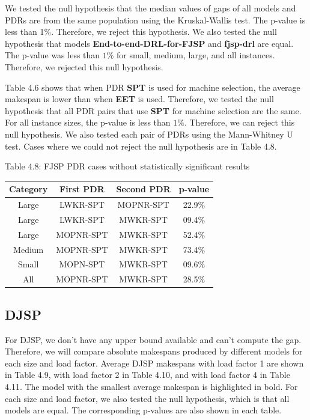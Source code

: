 We tested the null hypothesis that the median values of gaps of all models and PDRs are from the same population using the Kruskal-Wallis test. The p-value is less than 1$\%$. Therefore, we reject this hypothesis. We also tested the null hypothesis that models \textbf{End-to-end-DRL-for-FJSP} and \textbf{fjsp-drl} are equal. The p-value was less than $1\%$ for small, medium, large, and all instances. Therefore, we rejected this null hypothesis. 
\par
Table 4.6 shows that when PDR \textbf{SPT} is used for machine selection, the average makespan is lower than when \textbf{EET} is used. Therefore, we tested the null hypothesis that all PDR pairs that use \textbf{SPT} for machine selection are the same. For all instance sizes, the p-value is less than $1\%$. Therefore, we can reject this null hypothesis. We also tested each pair of PDRs using the Mann-Whitney U test. Cases where we could not reject the null hypothesis are in Table 4.8.

\begin{table}
    Table 4.8: FJSP PDR cases without statistically significant results\\
    \vspace{1mm}
    \footnotesize 
    \begin{tabular}{cccc}
        \toprule
        Category & First PDR & Second PDR & p-value \\
        \midrule
        Large & LWKR-SPT & MOPNR-SPT & 22.9$\%$ \\
        Large & LWKR-SPT & MWKR-SPT & 09.4$\%$ \\
        Large & MOPNR-SPT & MWKR-SPT & 52.4$\%$ \\
        Medium & MOPNR-SPT & MWKR-SPT & 73.4$\%$ \\
        Small & MOPN-SPT & MWKR-SPT & 09.6$\%$ \\
        All & MOPNR-SPT & MWKR-SPT & 28.5$\%$ \\
        \bottomrule
        \end{tabular}
\end{table}

\subsection{DJSP}

For DJSP, we don't have any upper bound available and can't compute the gap. Therefore, we will compare absolute makespans produced by different models for each size and load factor. Average DJSP makespans with load factor 1 are shown in Table 4.9, with load factor 2 in Table 4.10, and with load factor 4 in Table 4.11. The model with the smallest average makespan is highlighted in bold. For each size and load factor, we also tested the null hypothesis, which is that all models are equal. The corresponding p-values are also shown in each table.

